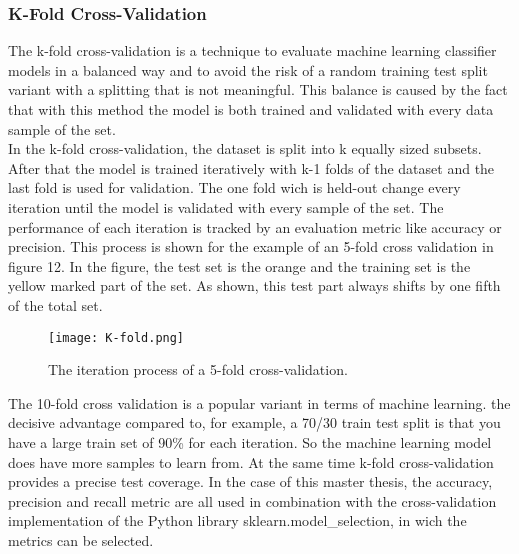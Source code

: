 \documentclass[../masterarbeit.tex]{subfiles}
\begin{document}
\subsubsection{K-Fold Cross-Validation}

The k-fold cross-validation is a technique to evaluate machine learning classifier models in a balanced way and to avoid the risk of a random training test split variant with a splitting that is not meaningful. This balance is caused by the fact that with this method the model is both trained and validated with every data sample of the set. \autocite[]{Refaeilzadeh2009} \\
In the k-fold cross-validation, the dataset is split into k equally sized subsets. After that the model is trained iteratively with k-1 folds of the dataset and the last fold is used for validation. The one fold wich is held-out change every iteration until the model is validated with every sample of the set. The performance of each iteration is tracked by an evaluation metric like accuracy or precision. This process is shown for the example of an 5-fold cross validation in figure 12. In the figure, the test set is the orange and the training set is the yellow marked part of the set. As shown, this test part always shifts by one fifth of the total set. \autocite[]{Refaeilzadeh2009} \\
\begin{figure}[h]
    \centering
    \texttt{[image: K-fold.png]}
    \caption{The iteration process of a 5-fold cross-validation.}
\end{figure}
The 10-fold cross validation is a popular variant in terms of machine learning. the decisive advantage compared to, for example, a 70/30 train test split is that you have a large train set of 90\% for each iteration. So the machine learning model does have more samples to learn from. At the same time k-fold cross-validation provides a precise test coverage. \autocite[]{analyticsvidhya_cross_validation:2022}
In the case of this master thesis, the accuracy, precision and recall metric are all used in combination with the cross-validation implementation of the Python library sklearn.model\_selection, in wich the metrics can be selected. 
\end{document}
